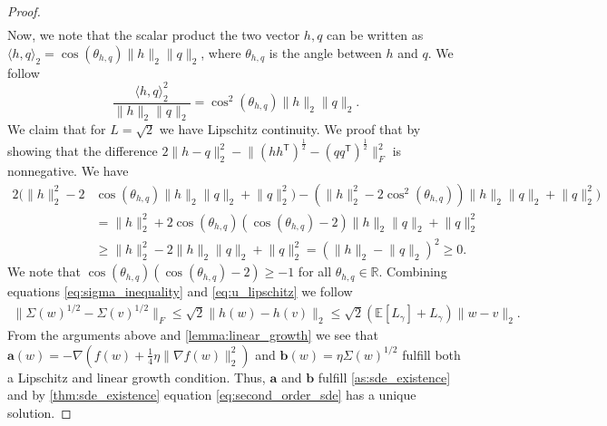 \documentclass[12pt]{article}
\theoremstyle{definition}
\numberwithin{equation}{section}
\newcommand{\R}{\mathbb{R}}
\newcommand{\T}{\mathsf{T}}
\newcommand{\ev}[1]{\mathbb{E}\left[{#1}\right]}
\newcommand{\norm}[1]{\lVert{#1}\rVert_2}
\newcommand{\normf}[1]{\lVert{#1}\rVert_F}
\newcommand{\scp}[2]{\langle{#1}, {#2}\rangle_2}
\begin{document}
\begin{proof}
\begin{equation}
\begin{split}
    \end{split}
  \end{equation}
  Now, we note that the scalar product the two vector $h,q$ can be written as $\scp{h}{q} = \cos(\theta_{h,q}) \norm{h} \norm{q}$, where $\theta_{h,q}$ is the angle between $h$ and $q$. We follow
  \begin{equation*}
    \frac{\scp{h}{q}^2}{\norm{h}\norm{q}} = \cos^2(\theta_{h,q})\norm{h}\norm{q}.
  \end{equation*}
  We claim that for $L = \sqrt{2}$ we have Lipschitz continuity. We proof that by showing that the difference $2 \norm{h-q}^2 - \normf{(hh^\T)^{\frac{1}{2}} - (qq^\T)^{\frac{1}{2}}}^2$ is nonnegative. We have
  \begin{align*}
    2 (\norm{h}^2 - 2 &\cos(\theta_{h,q}) \norm{h} \norm{q} + \norm{q}^2) - (\norm{h}^2 - 2 \cos^2(\theta_{h,q})) \norm{h} \norm{q} + \norm{q}^2) \\
    &= \norm{h}^2 + 2 \cos(\theta_{h,q})(\cos(\theta_{h,q}) - 2) \norm{h} \norm{q} + \norm{q}^2 \\
    &\geq \norm{h}^2 - 2\norm{h} \norm{q} + \norm{q}^2 = (\norm{h} - \norm{q})^2 \geq 0.
  \end{align*}
  We note that $\cos(\theta_{h,q})(\cos(\theta_{h,q}) -2 ) \geq -1$ for all $\theta_{h,q} \in \R$.
  Combining equations \eqref{eq:sigma_inequality} and \eqref{eq:u_lipschitz} we follow
  \begin{align*}
    \normf{\Sigma(w)^{1/2} - \Sigma(v)^{1/2}} \leq \sqrt{2}\norm{h(w) - h(v)} \leq \sqrt{2}\left(\ev{L_{\gamma}} + L_{\gamma}\right)\norm{w-v}.
  \end{align*}
  From the arguments above and \autoref{lemma:linear_growth} we see that $\mathbf{a}(w) = -\nabla \left( f(w) + \frac{1}{4}\eta \norm{\nabla f(w)}^2\right)$ and $\mathbf{b}(w) = \eta \Sigma(w)^{1/2}$ fulfill both a Lipschitz and linear growth condition. Thus, $\mathbf{a}$ and $\mathbf{b}$ fulfill \autoref{as:sde_existence} and by \autoref{thm:sde_existence} equation \eqref{eq:second_order_sde} has a unique solution.


\end{proof}
\end{document}
